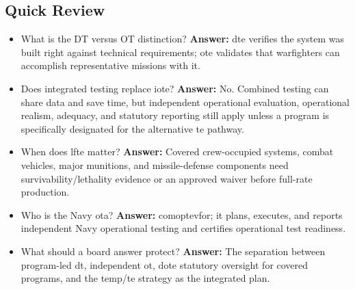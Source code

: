 \documentclass[../main.tex]{subfiles}
\begin{document}
\subsection{Quick Review}
\begin{itemize}
  \item What is the DT versus OT distinction? \textbf{Answer:} \ac{dte} verifies the system was built right against
  technical requirements; \ac{ote} validates that warfighters can accomplish representative missions with it.
  \item Does integrated testing replace \ac{iote}? \textbf{Answer:} No. Combined testing can share data and save time,
  but independent operational evaluation, operational realism, adequacy, and statutory reporting still apply unless a
  program is specifically designated for the alternative \ac{te} pathway.
  \item When does \ac{lfte} matter? \textbf{Answer:} Covered crew-occupied systems, combat vehicles, major munitions, and
  missile-defense components need survivability/lethality evidence or an approved waiver before full-rate production.
  \item Who is the Navy \ac{ota}? \textbf{Answer:} \ac{comoptevfor}; it plans, executes, and reports independent Navy
  operational testing and certifies operational test readiness.
  \item What should a board answer protect? \textbf{Answer:} The separation between program-led \ac{dt}, independent
  \ac{ot}, \ac{dote} statutory oversight for covered programs, and the \ac{temp}/\ac{te} strategy as the integrated plan.
\end{itemize}

\end{document}
